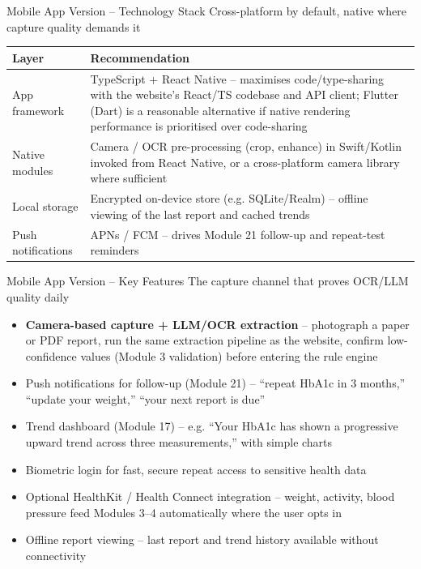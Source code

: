 \documentclass[9pt,aspectratio=169]{beamer}
\begin{document}
\begin{frame}[t]{Mobile App Version -- Technology Stack}
\textcolor{black!55}{\scriptsize Cross-platform by default, native where capture quality demands it}\\[2pt]
\begin{center}\scriptsize
\begin{tabular}{p{3.6cm}p{9.5cm}}
\toprule
\textbf{Layer} & \textbf{Recommendation} \\
\midrule
App framework & TypeScript + React Native -- maximises code/type-sharing with the website's React/TS codebase and API client; Flutter (Dart) is a reasonable alternative if native rendering performance is prioritised over code-sharing \\
Native modules & Camera / OCR pre-processing (crop, enhance) in Swift/Kotlin invoked from React Native, or a cross-platform camera library where sufficient \\
Local storage & Encrypted on-device store (e.g. SQLite/Realm) -- offline viewing of the last report and cached trends \\
Push notifications & APNs / FCM -- drives Module 21 follow-up and repeat-test reminders \\
\bottomrule
\end{tabular}
\end{center}
\end{frame}

\begin{frame}[t]{Mobile App Version -- Key Features}
\textcolor{black!55}{\scriptsize The capture channel that proves OCR/LLM quality daily}\\[2pt]
\begin{itemize}
\scriptsize
\item \textbf{Camera-based capture + LLM/OCR extraction} -- photograph a paper or PDF report, run the same extraction pipeline as the website, confirm low-confidence values (Module 3 validation) before entering the rule engine
\item Push notifications for follow-up (Module 21) -- ``repeat HbA1c in 3 months,'' ``update your weight,'' ``your next report is due''
\item Trend dashboard (Module 17) -- e.g. ``Your HbA1c has shown a progressive upward trend across three measurements,'' with simple charts
\item Biometric login for fast, secure repeat access to sensitive health data
\item Optional HealthKit / Health Connect integration -- weight, activity, blood pressure feed Modules 3--4 automatically where the user opts in
\item Offline report viewing -- last report and trend history available without connectivity
\end{itemize}
\end{frame}
\end{document}

